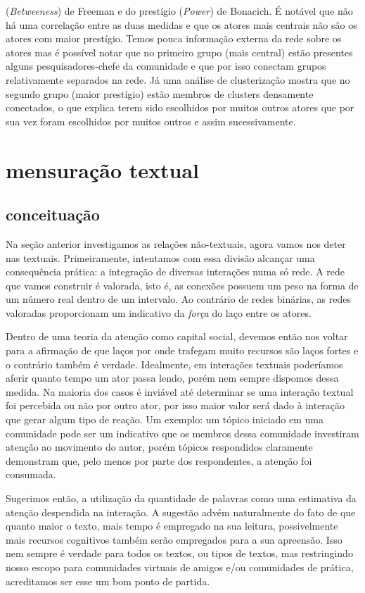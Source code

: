 \documentclass{article}
\begin{document}
\begin{table}[htb]
\begin{boxedminipage}{\textwidth}
(\textit{Betweeness}) de Freeman e do prestígio (\textit{Power}) de Bonacich.
É notável que não há uma correlação entre as duas medidas e que os atores mais
centrais não são os atores com maior prestígio. Temos pouca informação externa
da rede sobre os atores mas é possível notar que no primeiro grupo (mais
central) estão presentes alguns pesquisadores-chefe da comunidade e que por isso
conectam grupos relativamente separados na rede. Já uma análise de clusterização
mostra que no segundo grupo (maior prestígio) estão membros de clusters
densamente conectados, o que explica terem sido escolhidos por muitos outros
atores que por sua vez foram escolhidos por muitos outros e assim
sucessivamente.

	\end{boxedminipage}
\end{table}

\section{mensuração textual}
\subsection{conceituação}
Na seção anterior investigamos as relações não-textuais, agora vamos nos deter
nas textuais. Primeiramente, intentamos com essa divisão alcançar uma
consequência prática: a integração de diversas interações numa só rede. A rede
que vamos construir é valorada, isto é, as conexões possuem um peso na forma de
um número real dentro de um intervalo. Ao contrário de redes binárias, as redes
valoradas proporcionam um indicativo da \textit{força} do laço entre os atores.

Dentro de uma teoria da atenção como capital social, devemos então nos voltar
para a afirmação de que laços por onde trafegam muito recursos são laços fortes
e o contrário também é verdade. Idealmente, em interações textuais poderíamos
aferir quanto tempo um ator passa lendo, porém nem sempre dispomos dessa medida.
Na maioria dos casos é inviável até determinar se uma interação textual foi
percebida ou não por outro ator, por isso maior valor será dado à interação que
gerar algum tipo de reação. Um exemplo: um tópico iniciado em uma comunidade
pode ser um indicativo que os membros dessa comunidade investiram atenção ao
movimento do autor, porém tópicos respondidos claramente demonstram que, pelo
menos por parte dos respondentes, a atenção foi consumada.

Sugerimos então, a utilização da quantidade de palavras como uma estimativa da
atenção despendida na interação. A sugestão advém naturalmente do fato de que
quanto maior o texto, mais tempo é empregado na sua leitura, possivelmente mais
recursos cognitivos também serão empregados para a sua apreensão. Isso nem
sempre é verdade para todos os textos, ou tipos de textos, mas restringindo
nosso escopo para comunidades virtuais de amigos e/ou comunidades de prática,
acreditamos ser esse um bom ponto de partida.
\end{document}
